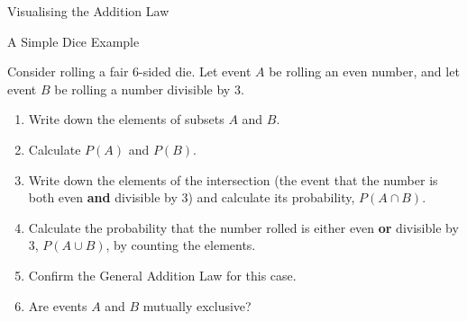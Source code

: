 \begin{frame}{Visualising the Addition Law}
    
\end{frame}

\begin{frame}{A Simple Dice Example}
    \begin{example}
        Consider rolling a fair 6-sided die. Let event $A$ be rolling an even number, and let event $B$ be rolling a number divisible by 3.
        
        \begin{enumerate}
            \item Write down the elements of subsets $A$ and $B$.
            \item Calculate $P(A)$ and $P(B)$.
            \item Write down the elements of the intersection (the event that the number is both even \textbf{and} divisible by 3) and calculate its probability, $P(A \cap B)$.
            \item Calculate the probability that the number rolled is either even \textbf{or} divisible by 3, $P(A \cup B)$, by counting the elements.
            \item Confirm the General Addition Law for this case.
            \item Are events $A$ and $B$ mutually exclusive?
        \end{enumerate}  
    \end{example}
\end{frame}


